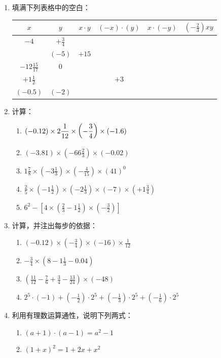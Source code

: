 \begin{enumerate}
	\item 填满下列表格中的空白：
	\begin{center}
		\begin{tabular}{c|c|c|c|c|c}
			\hline
			$x$  &  $y$  &  $x\cdot y$  &  $(-x)\cdot (y)$  &     $x\cdot (-y)$  &  $\left(-\frac{2}{3}\right)xy$\\
			\hline
			$-4$ & $+\frac{3}{4}$ &&&&\\
			& $(-5)$ & $+15$ &&& \\
			$-12\frac{15}{17}$ & 0&&&&\\
			$+1\frac{1}{2}$ & & & $+3$&&\\
			$(-0.5)$ & $(-2)$ &&&&\\
			\hline
		\end{tabular}    
	\end{center}
	
	\item 计算：
	\begin{enumerate}
		\item $(-0.12)\times 2\dfrac{1}{12}\times\left(-\dfrac{3}{4}\right)\times(-1.6)$
		\item $(-3.81) \times\left(-66 \frac{2}{3}\right) \times(-0.02)$
		\item $1 \frac{7}{8} \times\left(-3 \frac{1}{3}\right) \times\left(-\frac{4}{15}\right) \times(41)^{0}$
		\item $\frac{2}{5} \times\left(-1 \frac{1}{2}\right) \times\left(-2 \frac{1}{3}\right) \times(-7) \times\left(+1 \frac{3}{4}\right)$
		\item  $6^{2}-\left[4 \times\left(\frac{2}{3}-1 \frac{1}{2}\right) \times\left(-\frac{3}{2}\right)\right]$
	\end{enumerate}
	
	
	\item 计算，并注出每步的依据：
	\begin{enumerate}
		\item $(-0.12) \times\left(-\frac{3}{4}\right) \times(-16) \times \frac{1}{12}$
		\item $-\frac{3}{4} \times\left(8-1 \frac{1}{3}-0.04\right)$
		\item $\left(\frac{11}{12}-\frac{7}{6}+\frac{3}{4}-\frac{13}{24}\right) \times(-48)$
		\item $2^{5} \cdot(-1)+\left(-\frac{1}{2}\right) \cdot 2^{5}+\left(-\frac{1}{3}\right) \cdot 2^{5}+\left(-\frac{1}{6}\right) \cdot 2^{5}$
	\end{enumerate}
	
	\item 利用有理数运算通性，说明下列两式：
	\begin{enumerate}
		\item $(a + 1)\cdot (a-1) =a^2-1$
		\item $(1+ x)^2=1+2x+x^2$
	\end{enumerate}
	

\end{enumerate}
